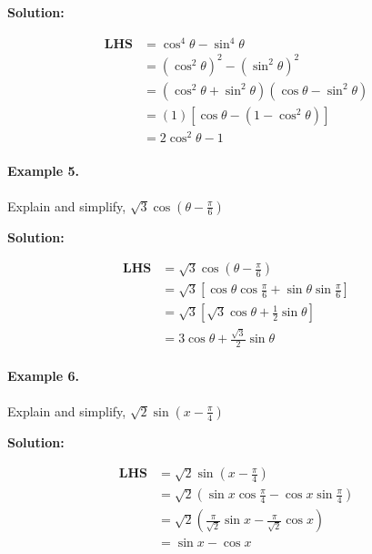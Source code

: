 \documentclass{article}
\begin{document}
{\scriptsize \textbf{Solution:}}

\[
  \begin{aligned}
    \textbf{LHS} &= \cos^{4}\theta-\sin^{4}\theta \\
                 &= (\cos^{2}\theta)^{2} - (\sin^{2}\theta)^{2} \\
                 &= (\cos^{2}\theta+\sin^{2}\theta)(\cos\theta - \sin^{2}\theta) \\
                 &= (1)[\cos\theta - (1-\cos^{2}\theta)] \\
                 &= 2\cos^{2}\theta - 1
  \end{aligned}
\]

\paragraph{Example 5.}
Explain and simplify, $\sqrt{3} \cos \left( \theta - \frac{\pi}{6} \right)$

{\scriptsize \textbf{Solution:}}

\[
  \begin{aligned}
    \textbf{LHS} &= \sqrt{3} \cos \left( \theta - \frac{\pi}{6} \right) \\
                 &= \sqrt{3} \left[ \cos\theta \cos\frac{\pi}{6} + \sin\theta \sin\frac{\pi}{6} \right] \\
                 &= \sqrt{3} \left[ \sqrt{3} \cos\theta + \frac{1}{2} \sin\theta \right] \\
                 &= 3 \cos\theta + \frac{\sqrt{3}}{2} \sin\theta
  \end{aligned}
\]

\paragraph{Example 6.}
Explain and simplify, $\sqrt{2} \sin \left( x - \frac{\pi}{4} \right)$

{\scriptsize \textbf{Solution:}}

\[
  \begin{aligned}
    \textbf{LHS} &= \sqrt{2} \sin \left( x - \frac{\pi}{4} \right) \\
                 &= \sqrt{2} \left( \sin x \cos\frac{\pi}{4} - \cos x \sin\frac{\pi}{4} \right) \\
                 &= \sqrt{2} \left( \frac{\pi}{\sqrt{2}} \sin x - \frac{\pi}{\sqrt{2}} \cos x \right) \\
                 &= \sin x - \cos x
  \end{aligned}
\]
\end{document}
